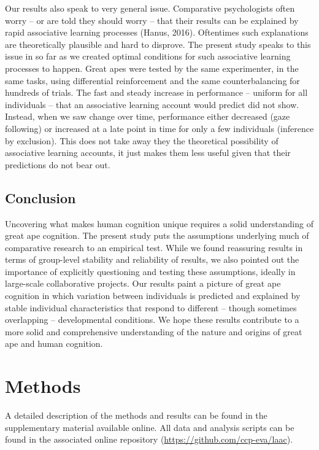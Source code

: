 \documentclass[
  man,floatsintext]{apa6}
\begin{document}
Our results also speak to very general issue. Comparative psychologists often worry -- or are told they should worry -- that their results can be explained by rapid associative learning processes (Hanus, 2016). Oftentimes such explanations are theoretically plausible and hard to disprove. The present study speaks to this issue in so far as we created optimal conditions for such associative learning processes to happen. Great apes were tested by the same experimenter, in the same tasks, using differential reinforcement and the same counterbalancing for hundreds of trials. The fast and steady increase in performance -- uniform for all individuals -- that an associative learning account would predict did not show. Instead, when we saw change over time, performance either decreased (gaze following) or increased at a late point in time for only a few individuals (inference by exclusion). This does not take away they the theoretical possibility of associative learning accounts, it just makes them less useful given that their predictions do not bear out.

\hypertarget{conclusion}{%
\subsection{Conclusion}\label{conclusion}}

Uncovering what makes human cognition unique requires a solid understanding of great ape cognition. The present study puts the assumptions underlying much of comparative research to an empirical test. While we found reassuring results in terms of group-level stability and reliability of results, we also pointed out the importance of explicitly questioning and testing these assumptions, ideally in large-scale collaborative projects. Our results paint a picture of great ape cognition in which variation between individuals is predicted and explained by stable individual characteristics that respond to different -- though sometimes overlapping -- developmental conditions. We hope these results contribute to a more solid and comprehensive understanding of the nature and origins of great ape and human cognition.

\hypertarget{methods}{%
\section{Methods}\label{methods}}

A detailed description of the methods and results can be found in the supplementary material available online. All data and analysis scripts can be found in the associated online repository (\url{https://github.com/ccp-eva/laac}).
\end{document}
